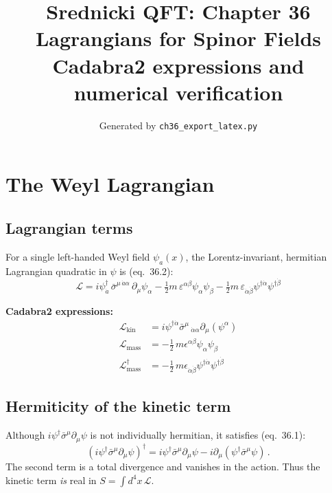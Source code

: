\documentclass[12pt]{article}
\title{\textbf{Srednicki QFT: Chapter 36}\\[6pt]
       \large Lagrangians for Spinor Fields\\[4pt]
       \normalsize Cadabra2 expressions and numerical verification}
\author{Generated by \texttt{ch36\_export\_latex.py}}
\date{}
\newcommand{\dal}{\dot{\alpha}}
\newcommand{\dbe}{\dot{\beta}}
\newcommand{\sigmabar}{\bar{\sigma}}
\begin{document}
\maketitle
\tableofcontents
\newpage

\section{The Weyl Lagrangian}

\subsection{Lagrangian terms}

For a single left-handed Weyl field $\psi_a(x)$, the Lorentz-invariant,
hermitian Lagrangian quadratic in $\psi$ is (eq.~36.2):
\begin{equation}
  \boxed{
    \mathcal{L}
    = i\psi^\dagger_{\dot{a}}\,\bar{\sigma}^{\mu\,\dot{a}\alpha}\,\partial_\mu\psi_\alpha
    - \tfrac{1}{2}m\,\varepsilon^{\alpha\beta}\psi_\alpha\psi_\beta
    - \tfrac{1}{2}m\,\varepsilon_{\dot{\alpha}\dot{\beta}}\psi^{\dagger\dot{\alpha}}\psi^{\dagger\dot{\beta}}
  }
  \tag{36.2}
\end{equation}

\medskip
\noindent\textbf{Cadabra2 expressions:}
\begin{align*}
  \mathcal{L}_{\text{kin}} &= i \psi^{\dagger \dal} \sigmabar^{\mu}\,_{\dal \alpha} \partial_{\mu}\left(\psi^{\alpha}\right) \\
  \mathcal{L}_{\text{mass}} &=  - \frac{1}{2}\,m \epsilon^{\alpha \beta} \psi_{\alpha} \psi_{\beta} \\
  \mathcal{L}_{\text{mass}}^\dagger &=  - \frac{1}{2}\,m \epsilon_{\dal \dbe} \psi^{\dagger \dal} \psi^{\dagger \dbe}
\end{align*}

\subsection{Hermiticity of the kinetic term}

Although $i\psi^\dagger\bar{\sigma}^\mu\partial_\mu\psi$ is not individually
hermitian, it satisfies (eq.~36.1):
\begin{equation}
  (i\psi^\dagger\bar{\sigma}^\mu\partial_\mu\psi)^\dagger
  = i\psi^\dagger\bar{\sigma}^\mu\partial_\mu\psi
    - i\partial_\mu(\psi^\dagger\bar{\sigma}^\mu\psi)\,.
  \tag{36.1}
\end{equation}
The second term is a total divergence and vanishes in the action.
Thus the kinetic term \emph{is} real in $S = \int d^4x\,\mathcal{L}$.
\end{document}
